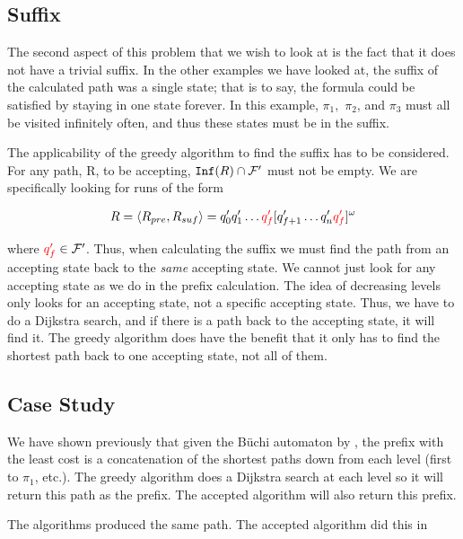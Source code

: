 \subsection{Suffix}
The second aspect of this problem that we wish to look at is the fact that it does not have a trivial suffix. In the other examples we have looked at, the suffix of the calculated path was a single state; that is to say, the formula could be satisfied by staying in one state forever. In this example, $\pi_1,$ $\pi_2$, and $\pi_3$ must all be visited infinitely often, and thus these states must be in the suffix. 

The applicability of the greedy algorithm to find the suffix has to be considered. For any path, R, to be accepting, $\texttt{Inf}(R) \cap \mathcal{F}'$ must not be empty. We are specifically looking for runs of the form 

\begin{align*}
R &= \langle R_{pre}, R_{suf} \rangle = q_0' q_1' \dots {\color{red} q_f'} [q_{f+1}' \dots q_n' {\color{red} q_f'}]^\omega \\
\end{align*}

where ${\color{red} q_f'} \in \mathcal{F}'$. Thus, when calculating the suffix we must find the path from an accepting state back to the \textit{same} accepting state. We cannot just look for any accepting state as we do in the prefix calculation. The idea of decreasing levels only looks for an accepting state, not a specific accepting state. Thus, we have to do a Dijkstra search, and if there is a path back to the accepting state, it will find it. The greedy algorithm does have the benefit that it only has to find the shortest path back to one accepting state, not all of them.


\subsection{Case Study}





We have shown previously that given the B\"{u}chi automaton by \cite{ltlbuchiwebsite}, the prefix with the least cost is a concatenation of the shortest paths down from each level (first to $\pi_1$, etc.). The greedy algorithm does a Dijkstra search at each level so it will return this path as the prefix. The accepted algorithm will also return this prefix. 

The algorithms produced the same path. The accepted algorithm did this in \\


